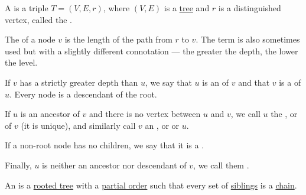 \begin{definition}\label{def:rooted_tree}
  A  is a triple \( T = (V, E, r) \), where \( (V, E) \) is a \hyperref[def:tree]{tree} and \( r \) is a distinguished vertex, called the .

  \begin{thmenum}
     The  of a node \( v \) is the length of the path from \( r \) to \( v \). The term  is also sometimes used but with a slightly different connotation --- the greater the depth, the lower the level.

     If \( v \) has a strictly greater depth than \( u \), we say that \( u \) is an  of \( v \) and that \( v \) is a  of \( u \). Every node is a descendant of the root.

     If \( u \) is an ancestor of \( v \) and there is no vertex between \( u \) and \( v \), we call \( u \) the ,  or  of \( v \) (it is unique), and similarly call \( v \) an ,  or  or \( u \).

     If a non-root node has no children, we say that it is a .

     Finally, \( u \) is neither an ancestor nor descendant of \( v \), we call them .
  \end{thmenum}
\end{definition}

\begin{definition}\label{def:ordered_tree}
  An  is a \hyperref[def:rooted_tree]{rooted tree} with a \hyperref[def:partially_ordered_set]{partial order} such that every set of \hyperref[def:rooted_tree/siblings]{siblings} is a \hyperref[def:partial_order_chain]{chain}.
\end{definition}

